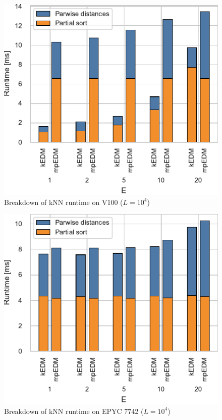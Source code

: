 \documentclass[conference]{IEEEtran}
\begin{document}
\begin{figure}
    \centering
    \includegraphics{figs/breakdown_knn_v100}
    \caption{Breakdown of kNN runtime on V100 ($L=10^4$)}%
    \label{fig:breakdown-knn-v100}
\end{figure}

\begin{figure}
    \centering
    \includegraphics{figs/breakdown_knn_epyc}
    \caption{Breakdown of kNN runtime on EPYC 7742 ($L=10^4$)}%
    \label{fig:breakdown-knn-epyc}
\end{figure}
\end{document}
